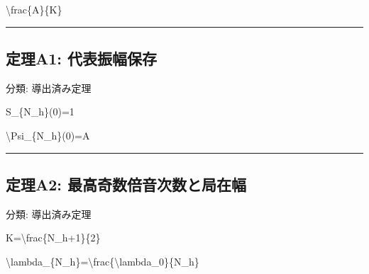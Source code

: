 \documentclass[
  a4paper,
]{ltjsarticle}
\newenvironment{Shaded}{}{}
\newcommand{\NormalTok}[1]{#1}
\begin{document}
\begin{Shaded}
\begin{Highlighting}[]
\NormalTok{\textbackslash{}frac\{A\}\{K\}}
\end{Highlighting}
\end{Shaded}

\begin{center}\rule{0.5\linewidth}{0.5pt}\end{center}

\subsection{定理A1:
代表振幅保存}\label{ux5b9aux7406a1-ux4ee3ux8868ux632fux5e45ux4fddux5b58}

分類: 導出済み定理

\begin{Shaded}
\begin{Highlighting}[]
\NormalTok{S\_\{N\_h\}(0)=1}
\end{Highlighting}
\end{Shaded}

\begin{Shaded}
\begin{Highlighting}[]
\NormalTok{\textbackslash{}Psi\_\{N\_h\}(0)=A}
\end{Highlighting}
\end{Shaded}

\begin{center}\rule{0.5\linewidth}{0.5pt}\end{center}

\subsection{定理A2:
最高奇数倍音次数と局在幅}\label{ux5b9aux7406a2-ux6700ux9ad8ux5947ux6570ux500dux97f3ux6b21ux6570ux3068ux5c40ux5728ux5e45}

分類: 導出済み定理

\begin{Shaded}
\begin{Highlighting}[]
\NormalTok{K=\textbackslash{}frac\{N\_h+1\}\{2\}}
\end{Highlighting}
\end{Shaded}

\begin{Shaded}
\begin{Highlighting}[]
\NormalTok{\textbackslash{}lambda\_\{N\_h\}=\textbackslash{}frac\{\textbackslash{}lambda\_0\}\{N\_h\}}
\end{Highlighting}
\end{Shaded}
\end{document}
